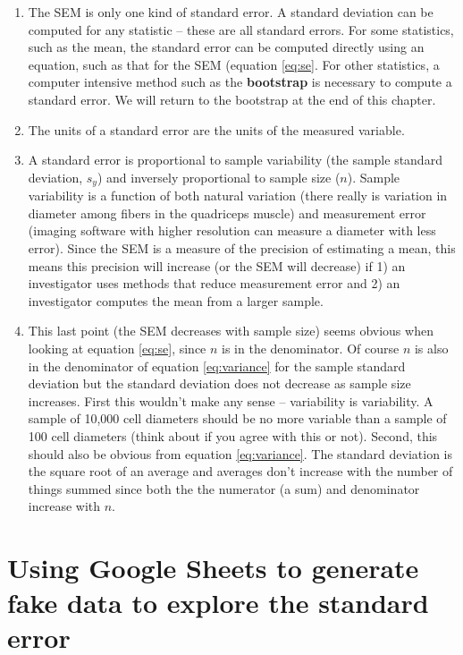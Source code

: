 \documentclass[]{book}
\providecommand{\tightlist}{%
  \setlength{\itemsep}{0pt}\setlength{\parskip}{0pt}}
\begin{document}
\begin{enumerate}
\def\labelenumi{\arabic{enumi}.}
\tightlist
\item
  The SEM is only one kind of standard error. A standard deviation can
  be computed for any statistic -- these are all standard errors. For
  some statistics, such as the mean, the standard error can be computed
  directly using an equation, such as that for the SEM (equation
  \eqref{eq:se}. For other statistics, a computer intensive method such as
  the \textbf{bootstrap} is necessary to compute a standard error. We
  will return to the bootstrap at the end of this chapter.
\item
  The units of a standard error are the units of the measured variable.
\item
  A standard error is proportional to sample variability (the sample
  standard deviation, \(s_y\)) and inversely proportional to sample size
  (\(n\)). Sample variability is a function of both natural variation
  (there really is variation in diameter among fibers in the quadriceps
  muscle) and measurement error (imaging software with higher resolution
  can measure a diameter with less error). Since the SEM is a measure of
  the precision of estimating a mean, this means this precision will
  increase (or the SEM will decrease) if 1) an investigator uses methods
  that reduce measurement error and 2) an investigator computes the mean
  from a larger sample.
\item
  This last point (the SEM decreases with sample size) seems obvious
  when looking at equation \eqref{eq:se}, since \(n\) is in the
  denominator. Of course \(n\) is also in the denominator of equation
  \eqref{eq:variance} for the sample standard deviation but the standard
  deviation does not decrease as sample size increases. First this
  wouldn't make any sense -- variability is variability. A sample of
  10,000 cell diameters should be no more variable than a sample of 100
  cell diameters (think about if you agree with this or not). Second,
  this should also be obvious from equation \eqref{eq:variance}. The
  standard deviation is the square root of an average and averages don't
  increase with the number of things summed since both the the numerator
  (a sum) and denominator increase with \(n\).
\end{enumerate}

\section{Using Google Sheets to generate fake data to explore the
standard
error}\label{using-google-sheets-to-generate-fake-data-to-explore-the-standard-error}
\end{document}
